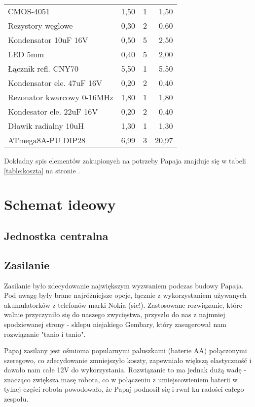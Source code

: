 \documentclass{article}
\begin{document}
\begin{table}[c]
\begin{tabular}{l|r|r|r}
CMOS-4051                     & 1,50        & 1     & 1,50         \\
Rezystory węglowe             & 0,30        & 2     & 0,60         \\
Kondensator 10uF 16V          & 0,50        & 5     & 2,50         \\
LED 5mm                       & 0,40        & 5     & 2,00         \\
Łącznik refl. CNY70           & 5,50        & 1     & 5,50         \\
Kondensator ele. 47uF 16V     & 0,20        & 2     & 0,40         \\
Rezonator kwarcowy 0-16MHz    & 1,80        & 1     & 1,80         \\
Kondesator ele. 22uF 16V      & 0,20        & 2     & 0,40         \\
Dławik radialny 10uH          & 1,30        & 1     & 1,30         \\
ATmega8A-PU DIP28             & 6,99        & 3     & 20,97        
\end{tabular}
\end{table}

Dokładny spis elementów zakupionych na potrzeby Papaja znajduje się w tabeli \ref{table:koszta} na stronie \pageref{table:koszta}.

\section{Schemat ideowy}

\subsection{Jednostka centralna}


\subsection{Zasilanie}

Zasilanie było zdecydowanie największym wyzwaniem podczas budowy Papaja. Pod uwagę były brane najróżniejsze opcje, łącznie z wykorzystaniem używanych akumulatorków z telefonów marki Nokia (sic!). Zastosowane rozwiązanie, które walnie przyczyniło się do naszego zwycięstwa, przyszło do nas z najmniej spodziewanej strony - sklepu niejakiego  Gembary, który zasugerował nam rozwiązanie "tanio i tanio".

Papaj zasilany jest ośmioma popularnymi paluszkami (baterie AA) połączonymi szeregowo, co zdecydowanie zmniejszyło koszty, zapewniało większą elastyczność i dawało nam całe 12V do wykorzystania. Rozwiązanie to ma jednak dużą wadę - znacząco zwiększa masę robota, co w połączeniu z umiejscowieniem baterii w tylnej części robota powodowało, że Papaj podnosił się i rwał ku radości całego zespołu. 
\end{document}
